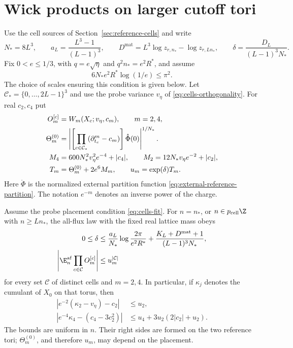 \section{Wick products on larger cutoff tori}\label{sec:vtm-wick}

Use the cell sources of Section~\ref{sec:reference-cells}
and write
\[
 N_*=8L^3,\qquad
 a_L=\frac{L^3-1}{(L-1)^3},\qquad
 D^{\mathrm{mat}}=L^3\log z_{r,n_*}-\log z_{r,Ln_*},
 \qquad
 \delta=\frac{D_L}{(L-1)^3N_*}.
\]
Fix $0<e\le1/3$, with $q=e\sqrt\eta$ and
$q^2n_*=e^2R^*$, and assume
\begin{equation}\label{eq:transfer-W3}
 6N_*e^2R^*\log(1/e)\le\pi^2.
\end{equation}
The choice of scales ensuring this condition is given
below. Let $\mathcal C_*=\{0,\ldots,2L-1\}^3$
and use the probe variance $v_\eta$ of
\eqref{eq:cells-orthogonality}. For real $c_2,c_4$ put
\begin{align}
 O_m^{[c]}&=W_m(X_c;v_\eta,c_m),\qquad m=2,4,
                                      \label{eq:transfer-Wick-observable}\\
 \Theta_m^{(0)}
  &=\left|
      \left[\prod_{c\in\mathcal C_*}
            (\partial_{t_c}^m-c_m)\right]\mathring\Phi(0)
    \right|^{1/N_*}.                  \label{eq:transfer-Theta}\\
 M_4&=600N_*^2v_\eta^2e^{-4}+|c_4|,\qquad
 M_2=12N_*v_\eta e^{-2}+|c_2|,\notag\\
 T_m&=\Theta_m^{(0)}+2e^6M_m,\qquad
 u_m=\exp(\delta)T_m.                 \label{eq:transfer-Wick-data}
\end{align}
Here $\mathring\Phi$ is the normalized external partition
function \eqref{eq:external-reference-partition}.
The notation $e^{-m}$ denotes an inverse power of the
charge.

\begin{proposition}\label{prop:transfer-Wick}
Assume the probe placement condition \eqref{eq:cells-fit}.
For $n=n_*$, or $n\in p_{\rm cell}\Z$ with $n\ge Ln_*$,
the all-flux law with the fixed real lattice mass obeys
\begin{align}
 0\le\delta
 &\le\frac{a_L}{N_*}\log\frac{2\pi}{e^2R^*}
       +\frac{K_L+D^{\mathrm{mat}}+1}{(L-1)^3N_*},
                                           \label{eq:transfer-delta}\\
 \left|\E_n^{\mathrm{af}}\prod_{c\in\mathcal C}
                        O_m^{[c]}\right|
 &\le u_m^{|\mathcal C|}              \label{eq:transfer-Wick-product}
\end{align}
for every set $\mathcal C$ of distinct cells and $m=2,4$.
In particular, if $\kappa_j$ denotes the cumulant of
$X_0$ on that torus, then
\begin{align}
 \left|e^{-2}(\kappa_2-v_\eta)-c_2\right|&\le u_2,
                                      \label{eq:transfer-second-cumulant}\\
 \left|e^{-4}\kappa_4-(c_4-3c_2^2)\right|
   &\le u_4+3u_2(2|c_2|+u_2).        \label{eq:transfer-fourth-cumulant}
\end{align}
The bounds are uniform in $n$.
Their right sides are formed on the two reference tori;
$\Theta_m^{(0)}$, and therefore $u_m$, may depend on
the placement.
\end{proposition}

